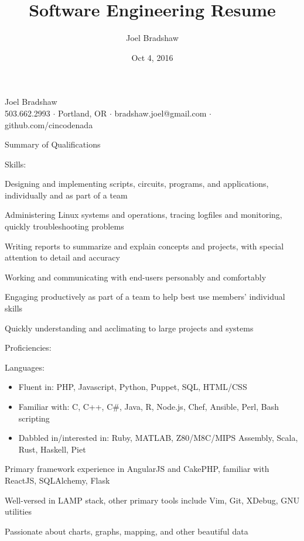 \documentclass[letterpaper,10pt]{article}
\newenvironment{res_section}[1]{%
  \vskip 6pt
  \noindent
  {\Large \textbf{#1}}\\
  \rule[8pt]{\textwidth}{0.5pt}
  \vskip -8pt
}{
}
\newenvironment{res_subsection}[1]{%
  \vskip 4pt
  \noindent
  \textbf{\large{#1}}
  \begin{itemize}
}{
  \end{itemize}
}
\begin{document}
\title{Software Engineering Resume}
\author{Joel Bradshaw}
\date{Oct 4, 2016}
\begin{center}
{\Huge Joel Bradshaw}\\
\vskip 2pt
{\large 503.662.2993 \ensuremath{\cdot} Portland, OR \ensuremath{\cdot} bradshaw.joel@gmail.com \ensuremath{\cdot} github.com/cincodenada}
\end{center}
\vskip -8pt
\begin{res_section}{Summary of Qualifications}
\begin{res_subsection}{Skills:}
  \item Designing and implementing scripts, circuits, programs, and applications, individually and as part of a team
  \item Administering Linux systems and operations, tracing logfiles and monitoring, quickly troubleshooting problems
  \item Writing reports to summarize and explain concepts and projects, with special attention to detail and accuracy
  \item Working and communicating with end-users personably and comfortably
  \item Engaging productively as part of a team to help best use members' individual skills
  \item Quickly understanding and acclimating to large projects and systems
\end{res_subsection}
\begin{res_subsection}{Proficiencies:}
  \item Languages:
  \def \multicolsep {0pt}
  \setlength{\columnsep}{-8pt}
  \begin{itemize}
    \item Fluent in: PHP, Javascript, Python, Puppet, SQL, HTML/CSS
    \item Familiar with: C, C++, C\#, Java, R, Node.js, Chef, Ansible, Perl, Bash scripting
    \item Dabbled in/interested in: Ruby, MATLAB, Z80/M8C/MIPS Assembly, Scala, Rust, Haskell, Piet
  \end{itemize}
  \item Primary framework experience in AngularJS and CakePHP, familiar with ReactJS, SQLAlchemy, Flask
  \item Well-versed in LAMP stack, other primary tools include Vim, Git, XDebug, GNU utilities
  \item Passionate about charts, graphs, mapping, and other beautiful data
\end{res_subsection}
\end{res_section}
\end{document}

